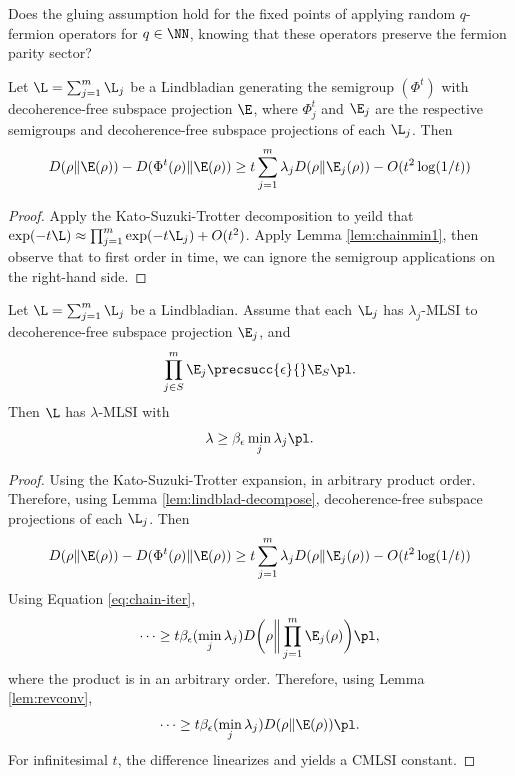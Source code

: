 \begin{quest} \normalfont
    Does the gluing assumption hold for the fixed points of applying random $q$-fermion operators for $q \in \NN$, knowing that these operators preserve the fermion parity sector?
\end{quest}
\begin{lemma} \label{lem:lindblad-decompose}
Let $\L = \sum_{j=1}^m \L_j$ be a Lindbladian generating the semigroup $(\Phi^t)$ with decoherence-free subspace projection $\E$, where $\Phi_j^t$ and $\E_j$ are the respective semigroups and decoherence-free subspace projections of each $\L_j$. Then
\begin{equation}
    D(\rho \| \E(\rho)) - D(\Phi^t(\rho) \| \E(\rho)) \geq t \sum_{j=1}^m \lambda_j D(\rho \| \E_j(\rho)) - O(t^2 \log (1/t))
\end{equation}
\end{lemma}
\begin{proof}
    Apply the Kato-Suzuki-Trotter decomposition to yeild that $\exp(- t \L) \approx \prod_{j=1}^m \exp(- t \L_j) + O(t^2)$. Apply Lemma \ref{lem:chainmin1}, then observe that to first order in time, we can ignore the semigroup applications on the right-hand side.
\end{proof}
\begin{lemma} \label{lem:combine}
Let $\L = \sum_{j=1}^m \L_j$ be a Lindbladian. Assume that each $\L_j$ has $\lambda_j$-MLSI to decoherence-free subspace projection $\E_j$, and
\begin{equation}
    \prod_{j \in S}^m \E_j \precsucc{\epsilon}{} \E_{S} \pl.
\end{equation}
Then $\L$ has $\lambda$-MLSI with
\begin{equation}
    \lambda \geq  \beta_{\epsilon} \min_j \lambda_j \pl.
\end{equation}
\end{lemma}
\begin{proof}
    Using the Kato-Suzuki-Trotter expansion,  in arbitrary product order. Therefore, using Lemma \ref{lem:lindblad-decompose},
    decoherence-free subspace projections of each $\L_j$. Then
    \begin{equation}
        D(\rho \| \E(\rho)) - D(\Phi^t(\rho) \| \E(\rho)) \geq t \sum_{j=1}^m \lambda_j D(\rho \| \E_j(\rho)) - O(t^2 \log (1/t))
    \end{equation}
    Using Equation \eqref{eq:chain-iter},
    \begin{equation}
        \dots \geq t \beta_{\epsilon} (\min_j \lambda_j) D \bigg ( \rho \bigg \| \prod_{j=1}^m \E_j (\rho) \bigg ) \pl,
    \end{equation}
    where the product is in an arbitrary order. Therefore, using Lemma \ref{lem:revconv},
    \begin{equation}
        \dots \geq t \beta_{\epsilon} (\min_j \lambda_j)  D(\rho \| \E(\rho)) \pl.
    \end{equation}
    For infinitesimal $t$, the difference linearizes and yields a CMLSI constant.
\end{proof}


